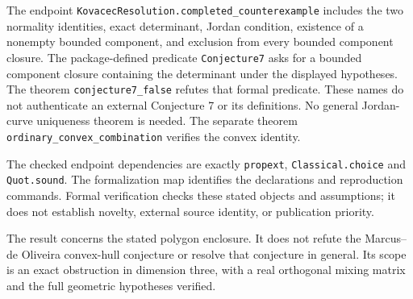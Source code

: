 \documentclass[11pt]{article}
\begin{document}
The endpoint \texttt{KovacecResolution.completed\_counterexample} includes the two normality identities, exact determinant, Jordan condition, existence of a nonempty bounded component, and exclusion from every bounded component closure. The package-defined predicate \texttt{Conjecture7} asks for a bounded component closure containing the determinant under the displayed hypotheses. The theorem \texttt{conjecture7\_false} refutes that formal predicate. These names do not authenticate an external Conjecture 7 or its definitions. No general Jordan-curve uniqueness theorem is needed. The separate theorem \texttt{ordinary\_convex\_combination} verifies the convex identity.

The checked endpoint dependencies are exactly \texttt{propext}, \texttt{Classical.choice} and \texttt{Quot.sound}. The formalization map identifies the declarations and reproduction commands. Formal verification checks these stated objects and assumptions; it does not establish novelty, external source identity, or publication priority.

The result concerns the stated polygon enclosure. It does not refute the Marcus--de Oliveira convex-hull conjecture or resolve that conjecture in general. Its scope is an exact obstruction in dimension three, with a real orthogonal mixing matrix and the full geometric hypotheses verified.



\end{document}
